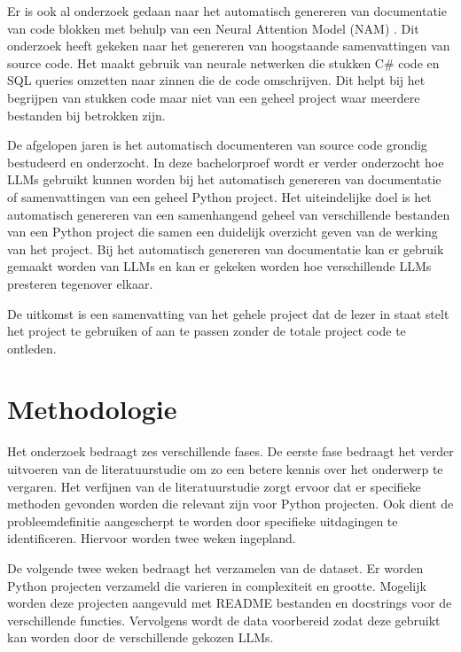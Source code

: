 Er is ook al onderzoek gedaan naar het automatisch genereren van documentatie van code blokken met behulp van een Neural Attention Model (NAM) \autocite{IyerEtAl2016}.
Dit onderzoek heeft gekeken naar het genereren van hoogstaande samenvattingen van source code. 
Het maakt gebruik van neurale netwerken die stukken C\# code en SQL queries omzetten naar zinnen die de code omschrijven. 
Dit helpt bij het begrijpen van stukken code maar niet van een geheel project waar meerdere bestanden bij betrokken zijn.

De afgelopen jaren is het automatisch documenteren van source code grondig bestudeerd en onderzocht.
In deze bachelorproef wordt er verder onderzocht hoe LLMs gebruikt kunnen worden bij het automatisch genereren van documentatie of samenvattingen van een geheel Python project.
Het uiteindelijke doel is het automatisch genereren van een samenhangend geheel van verschillende bestanden van een Python project die samen een duidelijk overzicht geven van de werking van het project.
Bij het automatisch genereren van documentatie kan er gebruik gemaakt worden van LLMs en kan er gekeken worden hoe verschillende LLMs presteren tegenover elkaar. 

De uitkomst is een samenvatting van het gehele project dat de lezer in staat stelt het project te gebruiken of aan te passen zonder de totale project code te ontleden.

\section{Methodologie}%
\label{sec:methodologie}

Het onderzoek bedraagt zes verschillende fases. 
De eerste fase bedraagt het verder uitvoeren van de literatuurstudie om zo een betere kennis over het onderwerp te vergaren.
Het verfijnen van de literatuurstudie zorgt ervoor dat er specifieke methoden gevonden worden die relevant zijn voor Python projecten.
Ook dient de probleemdefinitie aangescherpt te worden door specifieke uitdagingen te identificeren.
Hiervoor worden twee weken ingepland.

De volgende twee weken bedraagt het verzamelen van de dataset. Er worden Python projecten verzameld die varieren in complexiteit en grootte.
Mogelijk worden deze projecten aangevuld met README bestanden en docstrings voor de verschillende functies.
Vervolgens wordt de data voorbereid zodat deze gebruikt kan worden door de verschillende gekozen LLMs.

